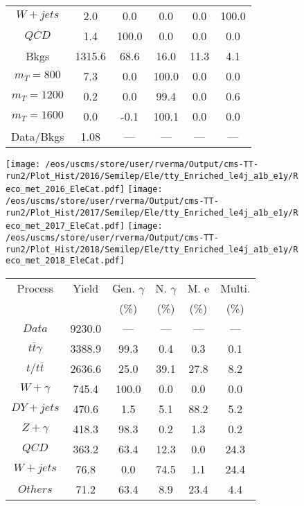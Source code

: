 \begin{figure}
\begin{minipage}[c]{0.32\textwidth}
{\begin{tabular}{cccccc}
$ W+jets $ &  2.0 &  0.0 &  0.0 &  0.0 &  100.0\\
$ QCD $ &  1.4 &  100.0 &  0.0 &  0.0 &  0.0\\
Bkgs &  1315.6 &  68.6 &  16.0 &  11.3 &  4.1\\
$ m_{T} = 800 $ &  7.3 &  0.0 &  100.0 &  0.0 &  0.0\\
$ m_{T} = 1200 $ &  0.2 &  0.0 &  99.4 &  0.0 &  0.6\\
$ m_{T} = 1600 $ &  0.0 &  -0.1 &  100.1 &  0.0 &  0.0\\
Data/Bkgs &  1.08 &  --- &  --- &  --- &  ---\\
\hline
\end{tabular}
}
\end{minipage}
\end{figure}

\begin{figure}
\centering
\texttt{[image: /eos/uscms/store/user/rverma/Output/cms-TT-run2/Plot\_Hist/2016/Semilep/Ele/tty\_Enriched\_le4j\_a1b\_e1y/Reco\_met\_2016\_EleCat.pdf]}
\texttt{[image: /eos/uscms/store/user/rverma/Output/cms-TT-run2/Plot\_Hist/2017/Semilep/Ele/tty\_Enriched\_le4j\_a1b\_e1y/Reco\_met\_2017\_EleCat.pdf]}
\texttt{[image: /eos/uscms/store/user/rverma/Output/cms-TT-run2/Plot\_Hist/2018/Semilep/Ele/tty\_Enriched\_le4j\_a1b\_e1y/Reco\_met\_2018\_EleCat.pdf]}
\begin{minipage}[c]{0.32\textwidth}
\centering
\tiny{
\begin{tabular}{cccccc}
\hline
Process & Yield & Gen. $\gamma$ & N. $\gamma$ & M. e & Multi. \\
 &  & (\%) & (\%) & (\%) & (\%)  \\
\hline
                                                                      $ Data $ &  9230.0 &  --- &  --- &  --- &  ---\\
$ t\bar{t}\gamma $ &  3388.9 &  99.3 &  0.4 &  0.3 &  0.1\\
$ t/t\bar{t} $ &  2636.6 &  25.0 &  39.1 &  27.8 &  8.2\\
$ W+\gamma $ &  745.4 &  100.0 &  0.0 &  0.0 &  0.0\\
$ DY+jets $ &  470.6 &  1.5 &  5.1 &  88.2 &  5.2\\
$ Z+\gamma $ &  418.3 &  98.3 &  0.2 &  1.3 &  0.2\\
$ QCD $ &  363.2 &  63.4 &  12.3 &  0.0 &  24.3\\
$ W+jets $ &  76.8 &  0.0 &  74.5 &  1.1 &  24.4\\
$ Others $ &  71.2 &  63.4 &  8.9 &  23.4 &  4.4\\

\end{tabular}}
\end{minipage}
\end{figure}

